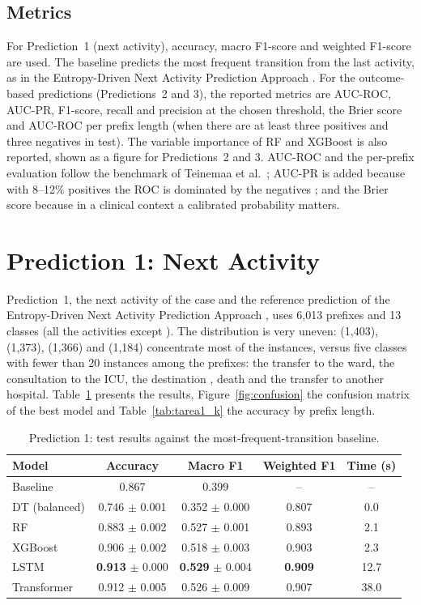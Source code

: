 \subsection{Metrics}

For Prediction~1 (next activity), accuracy, macro F1-score and weighted F1-score are used. The baseline predicts the most frequent transition from the last activity, as in the Entropy-Driven Next Activity Prediction Approach \cite{zare2025}. For the outcome-based predictions (Predictions~2 and 3), the reported metrics are AUC-ROC, AUC-PR, F1-score, recall and precision at the chosen threshold, the Brier score and AUC-ROC per prefix length (when there are at least three positives and three negatives in test). The variable importance of RF and XGBoost is also reported, shown as a figure for Predictions~2 and 3. AUC-ROC and the per-prefix evaluation follow the benchmark of Teinemaa et al.\ \cite{teinemaa2019}; AUC-PR is added because with 8--12\% positives the ROC is dominated by the negatives \cite{saito2015}; and the Brier score because in a clinical context a calibrated probability matters.

\section{Prediction 1: Next Activity}

Prediction~1, the next activity of the case and the reference prediction of the Entropy-Driven Next Activity Prediction Approach \cite{zare2025}, uses 6,013 prefixes and 13 classes (all the activities except ). The distribution is very uneven:  (1,403),  (1,373),  (1,366) and  (1,184) concentrate most of the instances, versus five classes with fewer than 20 instances among the prefixes: the transfer to the ward, the consultation to the ICU, the destination , death and the transfer to another hospital. Table~\ref{tab:tarea1} presents the results, Figure~\ref{fig:confusion} the confusion matrix of the best model and Table~\ref{tab:tarea1_k} the accuracy by prefix length.

\begin{table}[htbp]
\centering
\caption{Prediction 1: test results against the most-frequent-transition baseline.}
\label{tab:tarea1}
\begin{tabular}{lcccc}
\toprule
Model & Accuracy & Macro F1 & Weighted F1 & Time (s) \\
\midrule
Baseline & 0.867 & 0.399 & -- & -- \\
DT (balanced) & 0.746 $\pm$ 0.001 & 0.352 $\pm$ 0.000 & 0.807 & 0.0 \\
RF & 0.883 $\pm$ 0.002 & 0.527 $\pm$ 0.001 & 0.893 & 2.1 \\
XGBoost & 0.906 $\pm$ 0.002 & 0.518 $\pm$ 0.003 & 0.903 & 2.3 \\
LSTM & \textbf{0.913} $\pm$ 0.000 & \textbf{0.529} $\pm$ 0.004 & \textbf{0.909} & 12.7 \\
Transformer & 0.912 $\pm$ 0.005 & 0.526 $\pm$ 0.009 & 0.907 & 38.0 \\
\bottomrule
\end{tabular}
\end{table}

